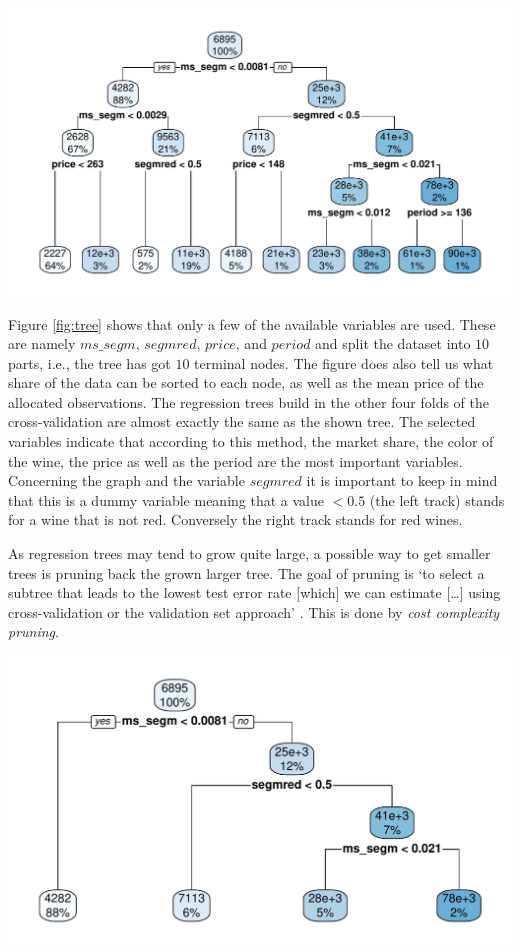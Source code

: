 \documentclass[11pt,]{article}
\let\origfigure\figure
\let\endorigfigure\endfigure
\renewenvironment{figure}[1][2] {
    \expandafter\origfigure\expandafter[H]
} {
    \endorigfigure
}
\begin{document}
\begin{figure}
\centering
\includegraphics{../00_data/output_paper/09_tree.pdf}
\caption{\label{fig:tree}Example of a Regression Tree.}
\end{figure}

Figure \ref{fig:tree} shows that only a few of the available variables
are used. These are namely \(ms\_segm\), \(segmred\), \(price\), and
\(period\) and split the dataset into \(10\) parts, i.e., the tree has
got \(10\) terminal nodes. The figure does also tell us what share of
the data can be sorted to each node, as well as the mean price of the
allocated observations. The regression trees build in the other four
folds of the cross-validation are almost exactly the same as the shown
tree. The selected variables indicate that according to this method, the
market share, the color of the wine, the price as well as the period are
the most important variables. Concerning the graph and the variable
\(segmred\) it is important to keep in mind that this is a dummy
variable meaning that a value \(< 0.5\) (the left track) stands for a
wine that is not red. Conversely the right track stands for red wines.

As regression trees may tend to grow quite large, a possible way to get
smaller trees is pruning back the grown larger tree. The goal of pruning
is `to select a subtree that leads to the lowest test error rate
{[}which{]} we can estimate {[}\ldots{]} using cross-validation or the
validation set approach' \autocite[][p. 308]{James2014}. This is done by
\emph{cost complexity pruning}.

\begin{figure}
\centering
\includegraphics{../00_data/output_paper/09_tree_pruned.pdf}
\caption{\label{fig:tree_pruned}Example of a Pruned Tree.}
\end{figure}
\end{document}

